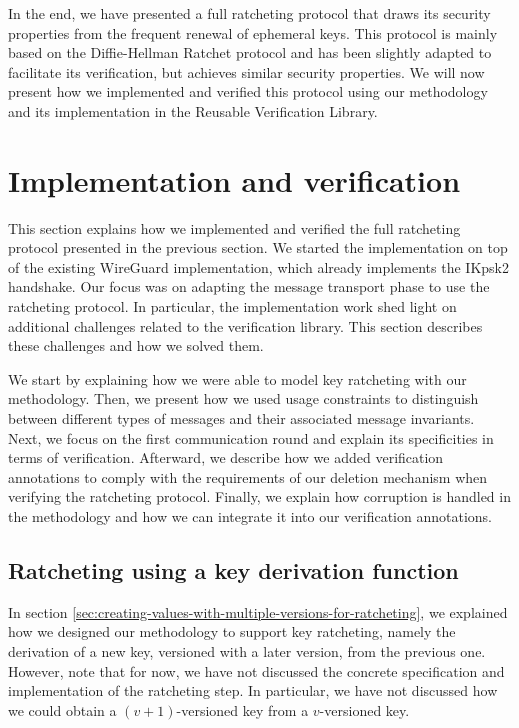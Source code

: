 In the end, we have presented a full ratcheting protocol that draws its security properties from the frequent renewal of ephemeral keys. This protocol is mainly based on the Diffie-Hellman Ratchet protocol and has been slightly adapted to facilitate its verification, but achieves similar security properties.
We will now present how we implemented and verified this protocol using our methodology and its implementation in the Reusable Verification Library. 

\section{Implementation and verification}
\label{sec:implementation-and-verification}

This section explains how we implemented and verified the full ratcheting protocol presented in the previous section.
We started the implementation on top of the existing WireGuard implementation, which already implements the IKpsk2 handshake.
Our focus was on adapting the message transport phase to use the ratcheting protocol.
In particular, the implementation work shed light on additional challenges related to the verification library. This section describes these challenges and how we solved them.

We start by explaining how we were able to model key ratcheting with our methodology.
Then, we present how we used usage constraints to distinguish between different types of messages and their associated message invariants.
Next, we focus on the first communication round and explain its specificities in terms of verification.
Afterward, we describe how we added verification annotations to comply with the requirements of our deletion mechanism when verifying the ratcheting protocol.
Finally, we explain how corruption is handled in the methodology and how we can integrate it into our verification annotations.

\subsection{Ratcheting using a key derivation function}
\label{sec:ratcheting-using-a-key-derivation-function}

In section \ref{sec:creating-values-with-multiple-versions-for-ratcheting}, we explained how we designed our methodology to support key ratcheting, namely the derivation of a new key, versioned with a later version, from the previous one.
However, note that for now, we have not discussed the concrete specification and implementation of the ratcheting step. In particular, we have not discussed how we could obtain a $(v+1)$-versioned key from a $v$-versioned key.

